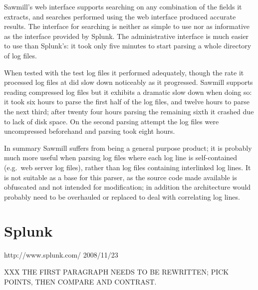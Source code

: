 Sawmill's web interface supports searching on any combination of the fields
it extracts, and searches performed using the web interface produced
accurate results.  The interface for searching is neither as simple to use
nor as informative as the interface provided by Splunk.  The administrative
interface is much easier to use than Splunk's: it took only five minutes to
start parsing a whole directory of log files.  

When tested with the \numberOFlogFILES{} test log files it performed
adequately, though the rate it processed log files at did slow down
noticeably as it progressed.  Sawmill supports reading compressed log files
but it exhibits a dramatic slow down when doing so: it took six hours to
parse the first half of the log files, and twelve hours to parse the next
third; after twenty four hours parsing the remaining sixth it crashed due
to lack of disk space.  On the second parsing attempt the log files were
uncompressed beforehand and parsing took eight hours.

In summary Sawmill suffers from being a general purpose product; it is
probably much more useful when parsing log files where each log line is
self-contained (e.g.\ web server log files), rather than log files
containing interlinked log lines.  It is not suitable as a base for this
parser, as the source code made available is obfuscated and not intended
for modification; in addition the architecture would probably need to be
overhauled or replaced to deal with correlating log lines.

\section{Splunk}

{http://www.splunk.com/}
{2008/11/23}

XXX THE FIRST PARAGRAPH NEEDS TO BE REWRITTEN\@; PICK POINTS, THEN COMPARE
AND CONTRAST\@.

